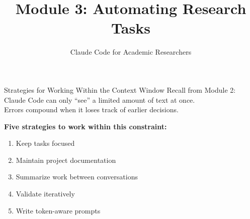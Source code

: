 \documentclass[aspectratio=169, 11pt]{beamer}
\title{Module 3: Automating Research Tasks}
\subtitle{Claude Code for Academic Researchers}
\author{} %
\date{}
\institute{}
\begin{document}
\begin{frame}[plain]
  \titlepage
\end{frame}


\begin{frame}{Strategies for Working Within the Context Window}
  Recall from Module 2: Claude Code can only ``see'' a limited amount of text at once.\\
  Errors compound when it loses track of earlier decisions.

  \vspace{0.5em}
  \textbf{Five strategies to work within this constraint:}
  \begin{enumerate}
    \item Keep tasks focused
    \item Maintain project documentation
    \item Summarize work between conversations
    \item Validate iteratively
    \item Write token-aware prompts
  \end{enumerate}
\end{frame}
\end{document}
